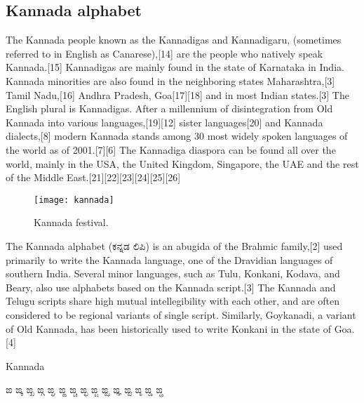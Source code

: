 \subsection{Kannada alphabet}
\label{s:kannada}

\newfontfamily{}

\def\kannadatext#1{{\kannada #1}}

The Kannada people known as the Kannadigas and Kannadigaru, (sometimes referred to in English as Canarese),[14] are the people who natively speak Kannada.[15] Kannadigas are mainly found in the state of Karnataka in India. Kannada minorities are also found in the neighboring states Maharashtra,[3] Tamil Nadu,[16] Andhra Pradesh, Goa[17][18] and in most Indian states.[3] The English plural is Kannadigas. After a millennium of disintegration from Old Kannada into various languages,[19][12] sister languages[20] and Kannada dialects,[8] modern Kannada stands among 30 most widely spoken languages of the world as of 2001.[7][6] The Kannadiga diaspora can be found all over the world, mainly in the USA, the United Kingdom, Singapore, the UAE and the rest of the Middle East.[21][22][23][24][25][26]

\begin{figure}[htbp]
\centering
\texttt{[image: kannada]}

\caption{Kannada festival.}
\end{figure}



The Kannada alphabet (\kannadatext{ಕನ್ನಡ ಲಿಪಿ}) is an abugida of the Brahmic family,[2] used primarily to write the Kannada language, one of the Dravidian languages of southern India. Several minor languages, such as Tulu, Konkani, Kodava, and Beary, also use alphabets based on the Kannada script.[3] The Kannada and Telugu scripts share high mutual intellegibility with each other, and are often considered to be regional variants of single script. Similarly, Goykanadi, a variant of Old Kannada, has been historically used to write Konkani in the state of Goa.[4]



\begin{scriptexample}[]{Kannada}
\centerline{\large\kannadatext{ಙ	ಙ್ಕ	ಙ್ಖ	ಙ್ಗ	ಙ್ಘ	ಙ್ಙ	ಙ್ಚ	ಙ್ಛ	ಙ್ಜ	ಙ್ಝ	ಙ್ಞ	ಙ್ಟ	ಙ್ಠ	ಙ್ಡ	ಙ್ಢ}}
\end{scriptexample}

